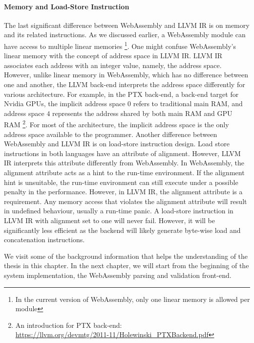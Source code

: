 \paragraph{Memory and Load-Store Instruction}
The last significant difference between WebAssembly and LLVM IR is on memory and its related instructions. As we discussed earlier, a WebAssembly module can have access to multiple linear memories \footnote{In the current version of WebAssembly, only one linear memory is allowed per module}. One might confuse WebAssembly's linear memory with the concept of address space in LLVM IR. LLVM IR associates each address with an integer value, namely, the address space. However, unlike linear memory in WebAssembly, which has no difference between one and another, the LLVM back-end interprets the address space differently for various architecture. For example, in the PTX back-end, a back-end target for Nvidia GPUs, the implicit address space $0$ refers to traditional main RAM, and address space $4$ represents the address shared by both main RAM and GPU RAM \footnote{An introduction for PTX back-end: \\\url{https://llvm.org/devmtg/2011-11/Holewinski_PTXBackend.pdf}}. For most of the architecture, the implicit address space is the only address space available to the programmer.  Another difference between WebAssembly and LLVM IR is on load-store instruction design. Load store instructions in both languages have an attribute of alignment. However, LLVM IR interprets this attribute differently from WebAssembly. In WebAssembly, the alignment attribute acts as a hint to the run-time environment. If the alignment hint is unsuitable, the run-time environment can still execute under a possible penalty in the performance. However, in LLVM IR, the alignment attribute is a requirement. Any memory access that violates the alignment attribute will result in undefined behaviour, usually a run-time panic. A load-store instruction in LLVM IR with alignment set to one will never fail. However, it will be significantly less efficient as the backend will likely generate byte-wise load and concatenation instructions.

We visit some of the background information that helps the understanding of the thesis in this chapter. In the next chapter, we will start from the beginning of the system implementation, the WebAssembly parsing and validation front-end.